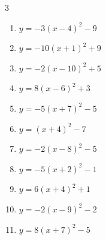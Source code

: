 \begin{multicols}{3}
\begin{enumerate}
  \item $\displaystyle y=-3\left( x-4\right)^{2}-9$

        \phantom{$\displaystyle 頂点\left( 4 , -9 \right)$}

  \item $\displaystyle y=-10\left( x+1\right)^{2}+9$

        \phantom{$\displaystyle 頂点\left( -1 , 9 \right)$}

  \item $\displaystyle y=-2\left( x-10\right)^{2}+5$

        \phantom{$\displaystyle 頂点\left( 10 , 5 \right)$}

  \item $\displaystyle y=8\left( x-6\right)^{2}+3$

        \phantom{$\displaystyle 頂点\left( 6 , 3 \right)$}

  \item $\displaystyle y=-5\left( x+7\right)^{2}-5$

        \phantom{$\displaystyle 頂点\left( -7 , -5 \right)$}

  \item $\displaystyle y=\left( x+4\right)^{2}-7$

        \phantom{$\displaystyle 頂点\left( -4 , -7 \right)$}

  \item $\displaystyle y=-2\left( x-8\right)^{2}-5$

        \phantom{$\displaystyle 頂点\left( 8 , -5 \right)$}

  \item $\displaystyle y=-5\left( x+2\right)^{2}-1$

        \phantom{$\displaystyle 頂点\left( -2 , -1 \right)$}

  \item $\displaystyle y=6\left( x+4\right)^{2}+1$

        \phantom{$\displaystyle 頂点\left( -4 , 1 \right)$}

  \item $\displaystyle y=-2\left( x-9\right)^{2}-2$

        \phantom{$\displaystyle 頂点\left( 9 , -2 \right)$}

  \item $\displaystyle y=8\left( x+7\right)^{2}-5$

        \phantom{$\displaystyle 頂点\left( -7 , -5 \right)$}

\columnbreak %


\end{enumerate}
\end{multicols}
